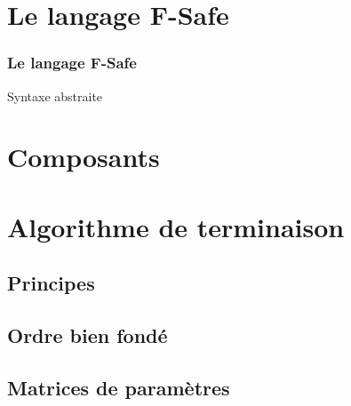 \section{Le langage F-Safe}

\begin{frame}
  \frametitle{Le langage F-Safe}
  \begin{block}{Syntaxe abstraite}
  \end{block}
\end{frame}

\section{Composants}

\begin{frame}
  \frametitle{}
  \begin{block}{}
  \end{block}
\end{frame}

\section{Algorithme de terminaison}

\subsection{Principes}

\begin{frame}
  \frametitle{}
  \begin{block}{}
  \end{block}
\end{frame}

\subsection{Ordre bien fondé}

\begin{frame}
  \frametitle{}
  \begin{block}{}
  \end{block}
\end{frame}

\subsection{Matrices de paramètres}

\begin{frame}
  \frametitle{}
  \begin{block}{}
  \end{block}
\end{frame}


